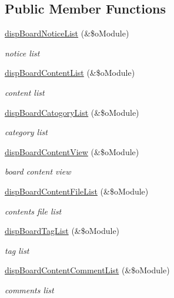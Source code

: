 \subsection*{Public Member Functions}
\begin{DoxyCompactItemize}
\item 
\hyperlink{classboardAPI_a18395a2be76383d74317c1fcc1fb5830}{disp\+Board\+Notice\+List} (\&\$o\+Module)
\begin{DoxyCompactList}\small\item\em notice list \end{DoxyCompactList}\item 
\hyperlink{classboardAPI_a7002a8159c34d85b969647c04f3baaa3}{disp\+Board\+Content\+List} (\&\$o\+Module)
\begin{DoxyCompactList}\small\item\em content list \end{DoxyCompactList}\item 
\hyperlink{classboardAPI_a1ff96d5cc71f583ac448718075141e88}{disp\+Board\+Catogory\+List} (\&\$o\+Module)
\begin{DoxyCompactList}\small\item\em category list \end{DoxyCompactList}\item 
\hyperlink{classboardAPI_aeaa451d5556251f9d148350b34d0481a}{disp\+Board\+Content\+View} (\&\$o\+Module)
\begin{DoxyCompactList}\small\item\em board content view \end{DoxyCompactList}\item 
\hyperlink{classboardAPI_a38441526c56c77613bb6681cf5c927d5}{disp\+Board\+Content\+File\+List} (\&\$o\+Module)
\begin{DoxyCompactList}\small\item\em contents file list \end{DoxyCompactList}\item 
\hyperlink{classboardAPI_af31d812495ea03d7a81c836463a56cad}{disp\+Board\+Tag\+List} (\&\$o\+Module)
\begin{DoxyCompactList}\small\item\em tag list \end{DoxyCompactList}\item 
\hyperlink{classboardAPI_af5b1506259e5aaec1b6f743ac6548203}{disp\+Board\+Content\+Comment\+List} (\&\$o\+Module)
\begin{DoxyCompactList}\small\item\em comments list \end{DoxyCompactList}\item 

\end{DoxyCompactItemize}
